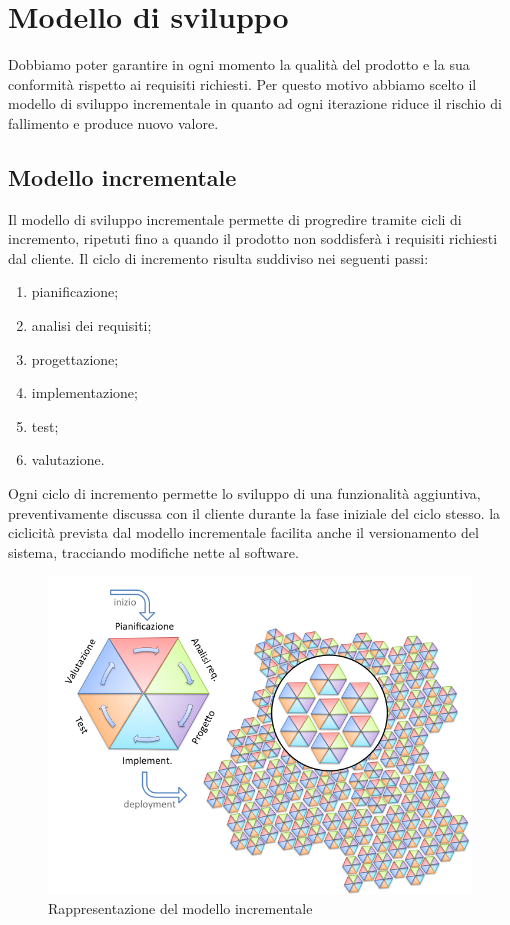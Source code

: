 \section{Modello di sviluppo}

Dobbiamo poter garantire in ogni momento la qualità del prodotto e la sua conformità rispetto ai requisiti richiesti.
Per questo motivo abbiamo scelto il modello di sviluppo incrementale in quanto ad ogni iterazione 
riduce il rischio di fallimento e produce nuovo valore.

\subsection{Modello incrementale}

Il modello di sviluppo incrementale permette di progredire tramite cicli di incremento, 
ripetuti fino a quando il prodotto non soddisferà i requisiti richiesti dal cliente.
Il ciclo di incremento risulta suddiviso nei seguenti passi:
\begin{enumerate}
    \item pianificazione;
    \item analisi dei requisiti;
    \item progettazione;
    \item implementazione;
    \item test;
    \item valutazione.
\end{enumerate}
Ogni ciclo di incremento permette lo sviluppo di una funzionalità aggiuntiva,
preventivamente discussa con il cliente durante la fase iniziale del ciclo stesso.
la ciclicità prevista dal modello incrementale facilita anche il versionamento del sistema,
tracciando modifiche nette al software.

\begin{figure}[H]
    \centering
    \includegraphics[scale = 0.5]{components/img/incrementale.png}
    \caption{Rappresentazione del modello incrementale}
    \label{fig:logo}
\end{figure}

